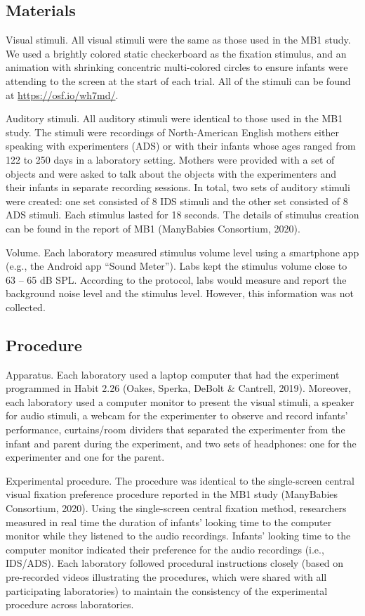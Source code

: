 \documentclass[
  english,
  ,man,floatsintext]{apa6}
\begin{document}
\subsection{Materials}\label{materials}

Visual stimuli. All visual stimuli were the same as those used in the MB1 study. We used a brightly colored static checkerboard as the fixation stimulus, and an animation with shrinking concentric multi-colored circles to ensure infants were attending to the screen at the start of each trial. All of the stimuli can be found at \url{https://osf.io/wh7md/}.

Auditory stimuli. All auditory stimuli were identical to those used in the MB1 study. The stimuli were recordings of North-American English mothers either speaking with experimenters (ADS) or with their infants whose ages ranged from 122 to 250 days in a laboratory setting. Mothers were provided with a set of objects and were asked to talk about the objects with the experimenters and their infants in separate recording sessions. In total, two sets of auditory stimuli were created: one set consisted of 8 IDS stimuli and the other set consisted of 8 ADS stimuli. Each stimulus lasted for 18 seconds. The details of stimulus creation can be found in the report of MB1 (ManyBabies Consortium, 2020).

Volume. Each laboratory measured stimulus volume level using a smartphone app (e.g., the Android app ``Sound Meter''). Labs kept the stimulus volume close to 63 -- 65 dB SPL. According to the protocol, labs would measure and report the background noise level and the stimulus level. However, this information was not collected.

\subsection{Procedure}\label{procedure}

Apparatus. Each laboratory used a laptop computer that had the experiment programmed in Habit 2.26 (Oakes, Sperka, DeBolt \& Cantrell, 2019). Moreover, each laboratory used a computer monitor to present the visual stimuli, a speaker for audio stimuli, a webcam for the experimenter to observe and record infants' performance, curtains/room dividers that separated the experimenter from the infant and parent during the experiment, and two sets of headphones: one for the experimenter and one for the parent.

Experimental procedure. The procedure was identical to the single-screen central visual fixation preference procedure reported in the MB1 study (ManyBabies Consortium, 2020). Using the single-screen central fixation method, researchers measured in real time the duration of infants' looking time to the computer monitor while they listened to the audio recordings. Infants' looking time to the computer monitor indicated their preference for the audio recordings (i.e., IDS/ADS). Each laboratory followed procedural instructions closely (based on pre-recorded videos illustrating the procedures, which were shared with all participating laboratories) to maintain the consistency of the experimental procedure across laboratories.
\end{document}
